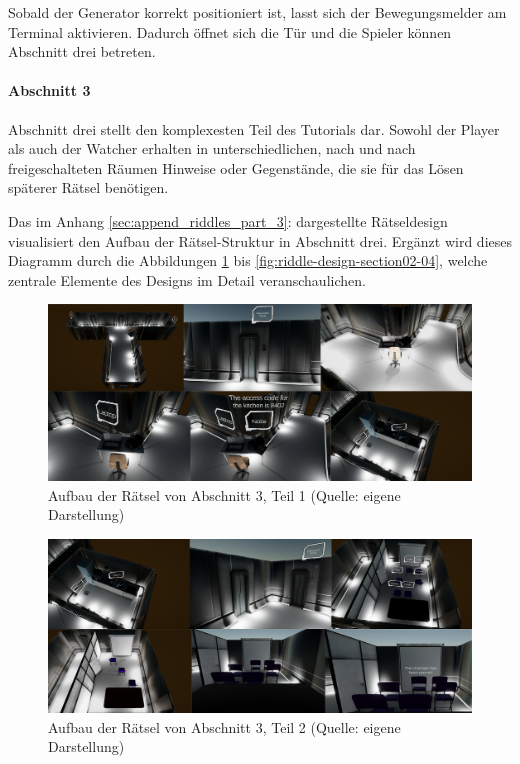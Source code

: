 Sobald der Generator korrekt positioniert ist, lasst sich der Bewegungsmelder am Terminal aktivieren. Dadurch öffnet sich die Tür und die Spieler können Abschnitt drei betreten.

\paragraph{Abschnitt 3}

Abschnitt drei stellt den komplexesten Teil des Tutorials dar. Sowohl der Player als auch der Watcher erhalten in unterschiedlichen, nach und nach freigeschalteten Räumen Hinweise oder Gegenstände, die sie für das Lösen späterer Rätsel benötigen.

Das im Anhang  \ref{sec:append_riddles_part_3}:  dargestellte Rätseldesign visualisiert den Aufbau der Rätsel-Struktur in Abschnitt drei. Ergänzt wird dieses Diagramm durch die Abbildungen \ref{fig:riddle-design-section02-00} bis \ref{fig:riddle-design-section02-04}, welche zentrale Elemente des Designs im Detail veranschaulichen.

\begin{figure}[ht]
\centering
\includegraphics[width=1\linewidth]{content/pictures/Rätseldesign - Abschnitt02 - Rätsel00.png}
\caption{Aufbau der Rätsel von Abschnitt 3, Teil 1 (Quelle: eigene Darstellung)}
\label{fig:riddle-design-section02-00}
\end{figure}

\begin{figure}[ht]
\centering
\includegraphics[width=1\linewidth]{content/pictures/Rätseldesign - Abschnitt02 - Rätsel01.png}
\caption{Aufbau der Rätsel von Abschnitt 3, Teil 2 (Quelle: eigene Darstellung)}
\label{fig:riddle-design-section02-0l}
\end{figure}

